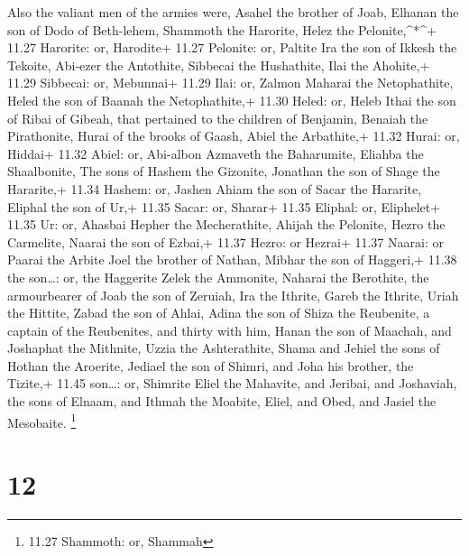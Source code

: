  Also the valiant men of the armies were, Asahel the
brother of Joab, Elhanan the son of Dodo of Beth-lehem, 
Shammoth the Harorite, Helez the Pelonite,\^{}*\^{}+ 11.27 Harorite: or,
Harodite+ 11.27 Pelonite: or, Paltite  Ira the son of
Ikkesh the Tekoite, Abi-ezer the Antothite,  Sibbecai the
Hushathite, Ilai the Ahohite,+ 11.29 Sibbecai: or, Mebunnai+ 11.29 Ilai:
or, Zalmon  Maharai the Netophathite, Heled the son of
Baanah the Netophathite,+ 11.30 Heled: or, Heleb  Ithai the
son of Ribai of Gibeah, that pertained to the children of Benjamin,
Benaiah the Pirathonite,  Hurai of the brooks of Gaash,
Abiel the Arbathite,+ 11.32 Hurai: or, Hiddai+ 11.32 Abiel: or,
Abi-albon  Azmaveth the Baharumite, Eliahba the
Shaalbonite,  The sons of Hashem the Gizonite, Jonathan the
son of Shage the Hararite,+ 11.34 Hashem: or, Jashen  Ahiam
the son of Sacar the Hararite, Eliphal the son of Ur,+ 11.35 Sacar: or,
Sharar+ 11.35 Eliphal: or, Eliphelet+ 11.35 Ur: or, Ahasbai
 Hepher the Mecherathite, Ahijah the Pelonite,
 Hezro the Carmelite, Naarai the son of Ezbai,+ 11.37
Hezro: or Hezrai+ 11.37 Naarai: or Paarai the Arbite  Joel
the brother of Nathan, Mibhar the son of Haggeri,+ 11.38 the son\ldots:
or, the Haggerite  Zelek the Ammonite, Naharai the
Berothite, the armourbearer of Joab the son of Zeruiah, 
Ira the Ithrite, Gareb the Ithrite,  Uriah the Hittite,
Zabad the son of Ahlai,  Adina the son of Shiza the
Reubenite, a captain of the Reubenites, and thirty with him,
 Hanan the son of Maachah, and Joshaphat the Mithnite,
 Uzzia the Ashterathite, Shama and Jehiel the sons of
Hothan the Aroerite,  Jediael the son of Shimri, and Joha
his brother, the Tizite,+ 11.45 son\ldots: or, Shimrite 
Eliel the Mahavite, and Jeribai, and Joshaviah, the sons of Elnaam, and
Ithmah the Moabite,  Eliel, and Obed, and Jasiel the
Mesobaite. \footnote{11.27 Shammoth: or, Shammah}

\hypertarget{section-11}{%
\section{12}\label{section-11}}

